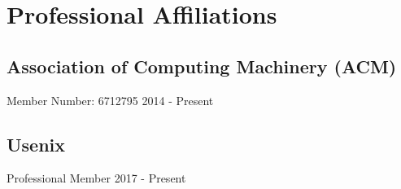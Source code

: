 \documentclass{article}
\begin{document}
\section{Professional Affiliations}
  \subsection{Association of Computing Machinery (ACM)}
    Member Number: 6712795 \hfill 2014 - Present
  \subsection{Usenix}
    Professional Member \hfill 2017 - Present
\end{document}
